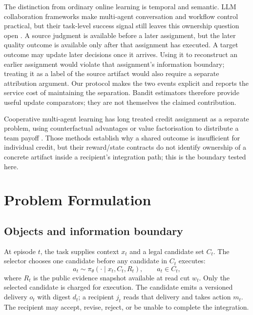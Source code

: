 \documentclass[sigconf,anonymous]{aamas}
\begin{document}
The distinction from ordinary online learning is temporal and semantic. LLM collaboration frameworks make multi-agent conversation and workflow control practical, but their task-level success signal still leaves this ownership question open \cite{wu2023autogen,zhuge2024gptswarm}. A source judgment is available before a later assignment, but the later quality outcome is available only after that assignment has executed. A target outcome may update later decisions once it arrives. Using it to reconstruct an earlier assignment would violate that assignment's information boundary; treating it as a label of the source artifact would also require a separate attribution argument. Our protocol makes the two events explicit and reports the service cost of maintaining the separation. Bandit estimators therefore provide useful update comparators; they are not themselves the claimed contribution.

Cooperative multi-agent learning has long treated credit assignment as a separate problem, using counterfactual advantages or value factorisation to distribute a team payoff \cite{foerster2018coma,rashid2020qmix}. Those methods establish why a shared outcome is insufficient for individual credit, but their reward/state contracts do not identify ownership of a concrete artifact inside a recipient's integration path; this is the boundary tested here.

\section{Problem Formulation}
\label{sec:problem}

\subsection{Objects and information boundary}
At episode $t$, the task supplies context $x_t$ and a legal candidate set $C_t$. The selector chooses one candidate before any candidate in $C_t$ executes:
\begin{equation}
 a_t\sim\pi_{\theta}(\cdot\mid x_t,C_t,R_t),\qquad a_t\in C_t,
 \label{eq:choice}
\end{equation}
where $R_t$ is the public evidence snapshot available at read cut $w_t$. Only the selected candidate is charged for execution. The candidate emits a versioned delivery $o_t$ with digest $d_t$; a recipient $j_t$ reads that delivery and takes action $m_t$. The recipient may accept, revise, reject, or be unable to complete the integration.
\end{document}
